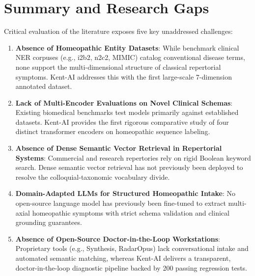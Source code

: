 
\section{Summary and Research Gaps}

Critical evaluation of the literature exposes five key unaddressed challenges:

\begin{enumerate}
  \item \textbf{Absence of Homeopathic Entity Datasets}: While benchmark clinical NER corpuses (e.g., i2b2, n2c2, MIMIC) catalog conventional disease terms, none support the multi-dimensional structure of classical repertorial symptoms. Kent-AI addresses this with the first large-scale 7-dimension annotated dataset.
  \item \textbf{Lack of Multi-Encoder Evaluations on Novel Clinical Schemas}: Existing biomedical benchmarks test models primarily against established datasets. Kent-AI provides the first rigorous comparative study of four distinct transformer encoders on homeopathic sequence labeling.
  \item \textbf{Absence of Dense Semantic Vector Retrieval in Repertorial Systems}: Commercial and research repertories rely on rigid Boolean keyword search. Dense semantic vector retrieval has not previously been deployed to resolve the colloquial-taxonomic vocabulary divide.
  \item \textbf{Domain-Adapted LLMs for Structured Homeopathic Intake}: No open-source language model has previously been fine-tuned to extract multi-axial homeopathic symptoms with strict schema validation and clinical grounding guarantees.
  \item \textbf{Absence of Open-Source Doctor-in-the-Loop Workstations}: Proprietary tools (e.g., Synthesis, RadarOpus) lack conversational intake and automated semantic matching, whereas Kent-AI delivers a transparent, doctor-in-the-loop diagnostic pipeline backed by 200 passing regression tests.
\end{enumerate}
